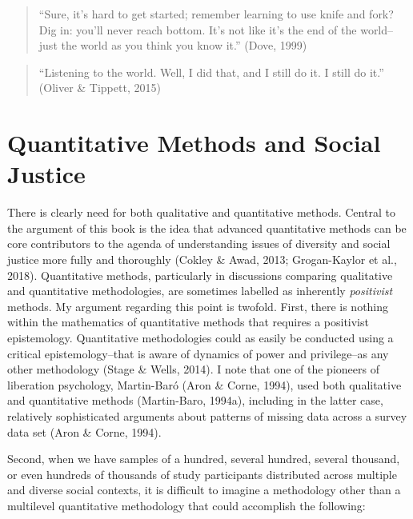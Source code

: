 \documentclass[
  letterpaper,
  DIV=11,
  numbers=noendperiod]{scrreprt}
\begin{document}
\begin{quote}
``Sure, it's hard to get started; remember learning to use knife and
fork? Dig in: you'll never reach bottom. It's not like it's the end of
the world--just the world as you think you know it.'' (Dove, 1999)
\end{quote}

\begin{quote}
``Listening to the world. Well, I did that, and I still do it. I still
do it.'' (Oliver \& Tippett, 2015)
\end{quote}

\section{Quantitative Methods and Social
Justice}\label{quantitative-methods-and-social-justice}

There is clearly need for both qualitative and quantitative methods.
 Central to the argument of
this book is the idea that advanced quantitative methods can be core
contributors to the agenda of understanding issues of diversity and
social justice more fully and thoroughly (Cokley \& Awad, 2013;
Grogan-Kaylor et al., 2018). Quantitative methods, particularly in
discussions comparing qualitative and quantitative methodologies, are
sometimes labelled as inherently \emph{positivist} methods.
 My argument regarding this point is twofold. First,
there is nothing within the mathematics of quantitative methods that
requires a positivist epistemology. Quantitative methodologies could as
easily be conducted using a critical epistemology--that is aware of
dynamics of power and privilege--as any other methodology (Stage \&
Wells, 2014). I note that one of the pioneers of liberation psychology,
Martin-Baró (Aron \& Corne, 1994), used both qualitative and
quantitative methods (Martin-Baro, 1994a), including in the latter case,
relatively sophisticated arguments about patterns of missing data across
a survey data set (Aron \& Corne, 1994). 

Second, when we have samples of a hundred, several hundred, several
thousand, or even hundreds of thousands of study participants
distributed across multiple and diverse social contexts, it is difficult
to imagine a methodology other than a multilevel quantitative
methodology that could accomplish the following:
\end{document}
